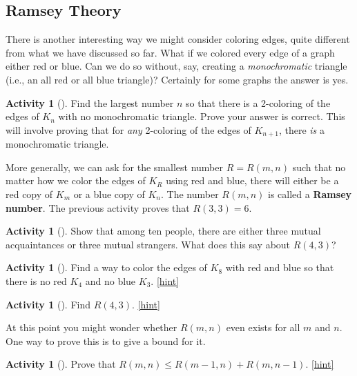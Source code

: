 \documentclass[10pt,]{book}
\newcommand{\terminology}[1]{\textbf{#1}}
\theoremstyle{plain}
\theoremstyle{definition}
\theoremstyle{definition}
\theoremstyle{definition}
\newtheorem{activity}[project]{Activity}
\numberwithin{equation}{chapter}
\begin{document}
\subsection[{Ramsey Theory}]{Ramsey Theory}\label{subsec-}
\hypertarget{p-408}{}%
There is another interesting way we might consider coloring edges, quite different from what we have discussed so far. What if we colored every edge of a graph either red or blue. Can we do so without, say, creating a \emph{monochromatic} triangle (i.e., an all red or all blue triangle)? Certainly for some graphs the answer is yes.%
\begin{activity}[]\label{act_R-3-3}
\hypertarget{p-409}{}%
Find the largest number \(n\) so that there is a 2-coloring of the edges of \(K_n\) with no monochromatic triangle.  Prove your answer is correct.  This will involve proving that for \emph{any} 2-coloring of the edges of \(K_{n+1}\), there \emph{is} a monochromatic triangle.%
\end{activity}
\hypertarget{p-410}{}%
More generally, we can ask for the smallest number \(R = R(m,n)\) such that no matter how we color the edges of \(K_R\) using red and blue, there will either be a red copy of \(K_m\) or a blue copy of \(K_n\).  The number \(R(m,n)\) is called a \terminology{Ramsey number}.  The previous activity proves that \(R(3,3) = 6\).%
\begin{activity}[]\label{activity-42}
\hypertarget{p-411}{}%
Show that among ten people, there are either three mutual acquaintances or three mutual strangers.  What does this say about \(R(4,3)\)?%
\end{activity}
\begin{activity}[]\label{activity-43}
\hypertarget{p-413}{}%
Find a way to color the edges of \(K_8\) with red and blue so that there is no red \(K_4\) and no blue \(K_3\).%
\hfill{\tiny\hyperlink{a-50}{[hint]}\hypertarget{q-50}{}}\end{activity}
\begin{activity}[]\label{activity-44}
\hypertarget{p-415}{}%
Find \(R(4,3)\).%
\hfill{\tiny\hyperlink{a-51}{[hint]}\hypertarget{q-51}{}}\end{activity}
\hypertarget{p-418}{}%
At this point you might wonder whether \(R(m,n)\) even exists for all \(m\) and \(n\).  One way to prove this is to give a bound for it.%
\begin{activity}[]\label{Ramseyrecurrence}
\hypertarget{p-419}{}%
Prove that \(R(m,n)\le R(m-1,n) + R(m,n-1)\).%
\hfill{\tiny\hyperlink{a-52}{[hint]}\hypertarget{q-52}{}}\end{activity}
\end{document}
